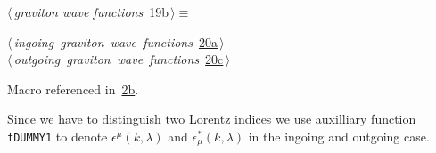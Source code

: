 \documentclass[a4paper,12pt]{amsart}
\renewcommand{\NWtarget}[2]{\hypertarget{#1}{#2}}
\renewcommand{\NWlink}[2]{\hyperlink{#1}{#2}}
\renewcommand{\NWtxtMacroRefIn}{Macro referenced in}
\renewcommand{\NWsep}{${\diamond}$}
\begin{document}
\begin{flushleft} \small
\begin{minipage}{\linewidth}\label{scrap40}\raggedright\small
\NWtarget{nuweb19b}{} $\langle\,${\itshape graviton wave functions}\nobreak\ {\footnotesize {19b}}$\,\rangle\equiv$
\vspace{-1ex}
\begin{list}{}{} \item
\mbox{}\verb@@\hbox{$\langle\,${\itshape ingoing graviton wave functions}\nobreak\ {\footnotesize \NWlink{nuweb20a}{20a}}$\,\rangle$}\verb@@\\
\mbox{}\verb@@\hbox{$\langle\,${\itshape outgoing graviton wave functions}\nobreak\ {\footnotesize \NWlink{nuweb20c}{20c}}$\,\rangle$}\verb@@{\NWsep}
\end{list}
\vspace{-1.5ex}
\footnotesize
\begin{list}{}{\setlength{\itemsep}{-\parsep}\setlength{\itemindent}{-\leftmargin}}
\item \NWtxtMacroRefIn\ \NWlink{nuweb2b}{2b}.

\item{}
\end{list}
\end{minipage}\vspace{4ex}
\end{flushleft}
Since we have to distinguish two Lorentz indices we use
auxilliary function \texttt{fDUMMY1}
to denote $\epsilon^\mu(k,\lambda)$ and $\epsilon^\ast_\mu(k,\lambda)$
in the ingoing and outgoing case.
\end{document}
